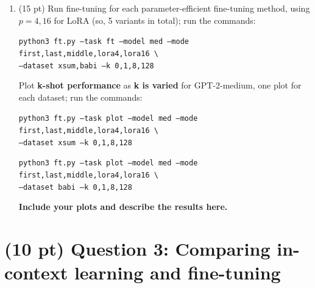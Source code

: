\documentclass[12pt]{article}
\begin{document}
\begin{enumerate}
    \item (15 pt) Run fine-tuning for each parameter-efficient fine-tuning method, using $p=4,16$ for LoRA (so, 5 variants in total); run the commands:

    {\small \texttt{python3 ft.py --task ft --model med --mode first,last,middle,lora4,lora16 \textbackslash \\
    \phantom{asdf}--dataset xsum,babi --k 0,1,8,128}}

    Plot \textbf{k-shot performance} as \textbf{k is varied} for GPT-2-medium, one plot for each dataset; run the commands:

    {\small \texttt{python3 ft.py --task plot --model med --mode first,last,middle,lora4,lora16 \textbackslash \\
    \phantom{asdf}--dataset xsum --k 0,1,8,128}}

    {\small \texttt{python3 ft.py --task plot --model med --mode first,last,middle,lora4,lora16 \textbackslash \\
    \phantom{asdf}--dataset babi --k 0,1,8,128}}
    
    \textbf{\color{red}Include your plots and describe the results here.}

\end{enumerate}

\section*{(10 pt) Question 3: Comparing in-context learning and fine-tuning}
\end{document}
